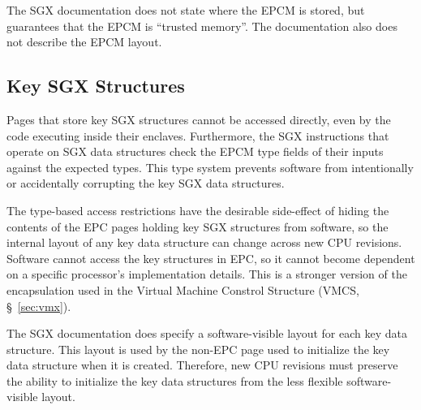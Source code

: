 The SGX documentation does not state where the EPCM is stored, but guarantees
that the EPCM is ``trusted memory''. The documentation also does not describe
the EPCM layout.


\subsection{Key SGX Structures}
\label{sec:key_structures}


Pages that store key SGX structures cannot be accessed directly, even by the
code executing inside their enclaves. Furthermore, the SGX instructions that
operate on SGX data structures check the EPCM type fields of their inputs
against the expected types. This type system prevents software from
intentionally or accidentally corrupting the key SGX data structures.

The type-based access restrictions have the desirable side-effect of hiding the
contents of the EPC pages holding key SGX structures from software, so the
internal layout of any key data structure can change across new CPU revisions.
Software cannot access the key structures in EPC, so it cannot become dependent
on a specific processor's implementation details. This is a stronger version of
the encapsulation used in the Virtual Machine Constrol Structure
(VMCS, \S~\ref{sec:vmx}).

The SGX documentation does specify a software-visible layout for each key data
structure. This layout is used by the non-EPC page used to initialize the key
data structure when it is created. Therefore, new CPU revisions must preserve
the ability to initialize the key data structures from the less flexible
software-visible layout.

